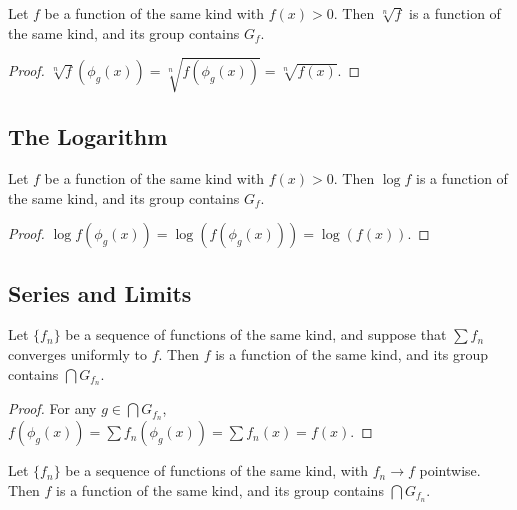 \begin{proposition}\label{prop:root_all}
Let $f$ be a function of the same kind with $f(x) > 0$. Then $\sqrt[n]{f}$ is a function of the same kind, and its group contains $G_f$.
\end{proposition}

\begin{proof}
$\sqrt[n]{f}(\phi_g(x)) = \sqrt[n]{f(\phi_g(x))} = \sqrt[n]{f(x)}$.
\end{proof}

\subsection{The Logarithm}

\begin{proposition}\label{prop:log_all}
Let $f$ be a function of the same kind with $f(x) > 0$. Then $\log f$ is a function of the same kind, and its group contains $G_f$.
\end{proposition}

\begin{proof}
$\log f(\phi_g(x)) = \log(f(\phi_g(x))) = \log(f(x))$.
\end{proof}

\subsection{Series and Limits}

\begin{proposition}\label{prop:series_all}
Let $\{f_n\}$ be a sequence of functions of the same kind, and suppose that $\sum f_n$ converges uniformly to $f$. Then $f$ is a function of the same kind, and its group contains $\bigcap G_{f_n}$.
\end{proposition}

\begin{proof}
For any $g \in \bigcap G_{f_n}$, $f(\phi_g(x)) = \sum f_n(\phi_g(x)) = \sum f_n(x) = f(x)$.
\end{proof}

\begin{proposition}\label{prop:limit_all}
Let $\{f_n\}$ be a sequence of functions of the same kind, with $f_n \to f$ pointwise. Then $f$ is a function of the same kind, and its group contains $\bigcap G_{f_n}$.
\end{proposition}

